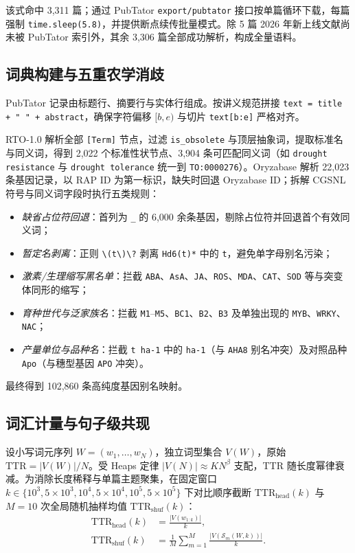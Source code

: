 \documentclass[conference]{IEEEtran}
\begin{document}
该式命中 3,311 篇；通过 PubTator \texttt{export/pubtator} 接口按单篇循环下载，每篇强制 \texttt{time.sleep(5.8)}，并提供断点续传批量模式。除 5 篇 2026 年新上线文献尚未被 PubTator 索引外，其余 3,306 篇全部成功解析，构成全量语料。

\subsection{词典构建与五重农学消歧}
PubTator 记录由标题行、摘要行与实体行组成。按讲义规范拼接 \texttt{text = title + " " + abstract}，确保字符偏移 $[b,e)$ 与切片 \texttt{text[b:e]} 严格对齐。

RTO-1.0 解析全部 \texttt{[Term]} 节点，过滤 \texttt{is\_obsolete} 与顶层抽象词，提取标准名与同义词，得到 2,022 个标准性状节点、3,904 条可匹配同义词（如 \texttt{drought resistance} 与 \texttt{drought tolerance} 统一到 \texttt{TO:0000276}）。Oryzabase 解析 22,023 条基因记录，以 RAP ID 为第一标识，缺失时回退 Oryzabase ID；拆解 CGSNL 符号与同义词字段时执行五类规则：
\begin{itemize}\setlength{\itemsep}{0pt}\setlength{\parsep}{0pt}\setlength{\topsep}{0.5pt}
  \item \textit{缺省占位符回退}：首列为 \texttt{\_} 的 6,000 余条基因，剔除占位符并回退首个有效同义词；
  \item \textit{暂定名剥离}：正则 \texttt{\textbackslash(t\textbackslash)\textbackslash*?} 剥离 \texttt{Hd6(t)*} 中的 \texttt{t}，避免单字母别名污染；
  \item \textit{激素/生理缩写黑名单}：拦截 \texttt{ABA}、\texttt{AsA}、\texttt{JA}、\texttt{ROS}、\texttt{MDA}、\texttt{CAT}、\texttt{SOD} 等与突变体同形的缩写；
  \item \textit{育种世代与泛家族名}：拦截 \texttt{M1}--\texttt{M5}、\texttt{BC1}、\texttt{B2}、\texttt{B3} 及单独出现的 \texttt{MYB}、\texttt{WRKY}、\texttt{NAC}；
  \item \textit{产量单位与品种名}：拦截 \texttt{t ha-1} 中的 \texttt{ha-1}（与 \texttt{AHA8} 别名冲突）及对照品种 \texttt{Apo}（与穗型基因 \texttt{APO} 冲突）。
\end{itemize}
最终得到 102,860 条高纯度基因别名映射。

\subsection{词汇计量与句子级共现}
设小写词元序列 $W=(w_1,\dots,w_N)$，独立词型集合 $V(W)$，原始 $\text{TTR}=|V(W)|/N$。受 Heaps 定律 $|V(N)|\approx K N^{\beta}$ 支配，TTR 随长度幂律衰减。为消除长度稀释与单篇主题聚集，在固定窗口 $k\in\{10^3,5\times10^3,10^4,5\times10^4,10^5,5\times10^5\}$ 下对比顺序截断 $\text{TTR}_{\text{head}}(k)$ 与 $M=10$ 次全局随机抽样均值 $\text{TTR}_{\text{shuf}}(k)$：
\begin{equation}
\begin{aligned}
\text{TTR}_{\text{head}}(k) &= \frac{|V(w_{1:k})|}{k}, \\
\text{TTR}_{\text{shuf}}(k) &= \frac{1}{M}\sum_{m=1}^{M}\frac{|V(\mathcal{S}_m(W,k))|}{k}.
\end{aligned}
\label{eq:ttr}
\end{equation}
\end{document}
